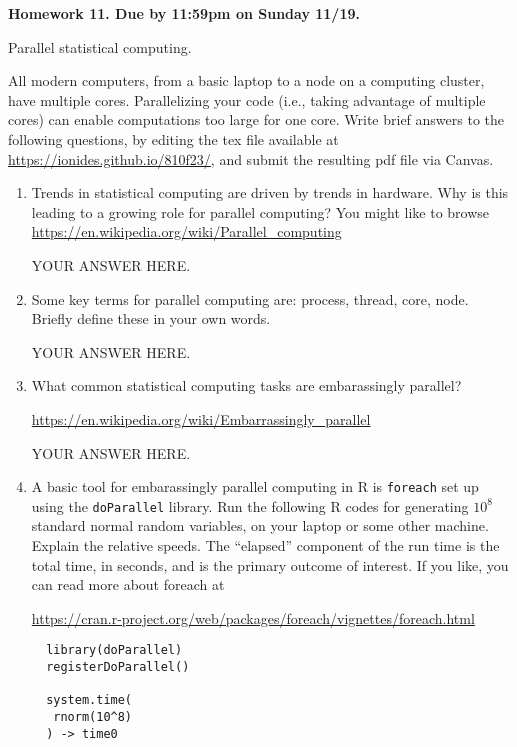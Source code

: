\documentclass[12pt]{article}
\begin{document}
\begin{center}\bf
Homework 11. Due by 11:59pm on Sunday 11/19.

Parallel statistical computing.

\end{center}

All modern computers, from a basic laptop to a node on a computing cluster, have multiple cores. Parallelizing your code (i.e., taking advantage of multiple cores) can enable computations too large for one core. Write brief answers to the following questions, by editing the tex file available at \url{https://ionides.github.io/810f23/}, and submit the resulting pdf file via Canvas. 

\begin{enumerate}

\item Trends in statistical computing are driven by trends in hardware. Why is this leading to a growing role for parallel computing? You might like to browse\\
\url{https://en.wikipedia.org/wiki/Parallel_computing}

YOUR ANSWER HERE.

\item Some key terms for parallel computing are: process, thread, core, node. Briefly define these in your own words.

YOUR ANSWER HERE.
  
\item What common statistical computing tasks are embarassingly parallel?

\url{https://en.wikipedia.org/wiki/Embarrassingly_parallel}

YOUR ANSWER HERE.

\item A basic tool for embarassingly parallel computing in R is \texttt{foreach} set up using the \texttt{doParallel} library. Run the following R codes for generating $10^8$ standard normal random variables, on your laptop or some other machine. Explain the relative speeds. The ``elapsed'' component of the run time is the total time, in seconds, and is the primary outcome of interest. If you like, you can read more about foreach at
  
\url{https://cran.r-project.org/web/packages/foreach/vignettes/foreach.html}

\begin{verbatim} 
  library(doParallel)
  registerDoParallel()

  system.time(
   rnorm(10^8)
  ) -> time0


\end{verbatim}
\end{enumerate}
\end{document}
